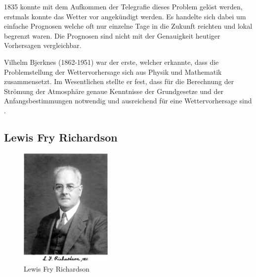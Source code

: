 \begin{refsection}
1835 konnte mit dem Aufkommen der Telegrafie dieses Problem gelöst werden, erstmals konnte das Wetter vor angekündigt werden. Es handelte sich dabei um einfache Prognosen welche oft nur einzelne Tage in die Zukunft reichten und lokal begrenzt waren. Die Prognosen sind nicht mit der Genauigkeit heutiger Vorhersagen vergleichbar.

Vilhelm Bjerknes (1862-1951) war der erste, welcher erkannte, dass die Problemstellung der Wettervorhersage sich aus Physik und Mathematik zusammensetzt. Im Wesentlichen stellte er fest, dass für die Berechnung der Strömung der Atmosphäre genaue Kenntnisse der Grundgesetze und der Anfangsbestimmungen notwendig und ausreichend für eine Wettervorhersage sind \cite{klima:stocker}.

\subsection{Lewis Fry Richardson
\label{klima:subsection:richardson}}

\begin{figure}
\centering
\includegraphics[width=0.4\textwidth]{klima/richardson.jpg}
\caption{Lewis Fry Richardson \cite{klima:biography}
\label{klima:geschichte:richardson}}
\end{figure}


\end{refsection}
